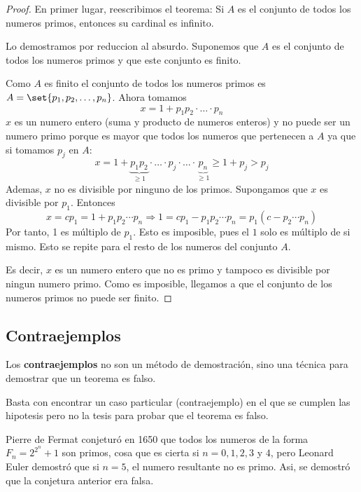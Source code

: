 \begin{proof}
	En primer lugar, reescribimos el teorema: Si \(A \) es el conjunto de todos los numeros primos, entonces su cardinal es infinito.

	Lo demostramos por reduccion al absurdo. Suponemos que \(A \) es el conjunto de todos los numeros primos y que este conjunto es finito.

	Como \(A \) es finito el conjunto de todos los numeros primos es \(A = \set{p_1,p_2,\ldots,p_n}\). Ahora tomamos
	\[
		x = 1 + p_1 p_2 \cdot \ldots \cdot p_n
	\]
	\(x \) es un numero entero (suma y producto de numeros enteros) y no puede ser un numero primo porque es mayor que todos los numeros que pertenecen a \(A \) ya que si tomamos \(p_j \) en \(A \):
	\[x = 1 + \underbrace{p_1 p_2}_{\geq 1} \cdot \ldots \cdot p_j \cdot \ldots \cdot \underbrace{p_n}_{\geq 1} \geq 1 + p_j > p_j\]
	Ademas, \(x\) no es divisible por ninguno de los primos. Supongamos que \(x \) es divisible por \(p_1\). Entonces \[x = c p_1 = 1 + p_1 p_2 \cdots p_n \Rightarrow 1 = c p_1 - p_1 p_2 \cdots p_n = p_1 (c - p_2 \cdots p_n )\]
	Por tanto, 1 es múltiplo de \(p_1 \). Esto es imposible, pues el \(1 \) solo es múltiplo de si mismo. Esto se repite para el resto de los numeros del conjunto \(A \).

	Es decir, \(x \) es un numero entero que no es primo y tampoco es divisible por ningun numero primo. Como es imposible, llegamos a que el conjunto de los numeros primos no puede ser finito.
\end{proof}

\subsection{Contraejemplos}

Los \textbf{contraejemplos} no son un método de demostración, sino una técnica para demostrar que un teorema es falso.

Basta con encontrar un caso particular (contraejemplo) en el que se cumplen las hipotesis pero no la tesis para probar que el teorema es falso.

\begin{example}
	Pierre de Fermat conjeturó en 1650 que todos los numeros de la forma \(F_n = 2^{2^{n} } + 1 \) son primos, cosa que es cierta si \(n =0,1,2,3\) y \(4 \), pero Leonard Euler demostró que si \(n=5\), el numero resultante no es primo. Asi, se demostró que la conjetura anterior era falsa.
\end{example}

